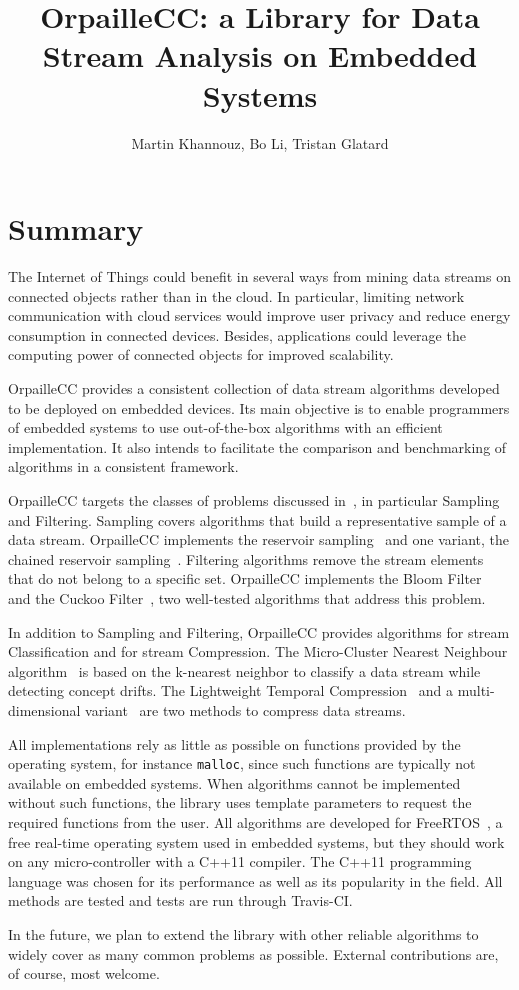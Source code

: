 \documentclass{article}
\title{OrpailleCC: a Library for Data Stream Analysis on Embedded Systems}
\author{Martin Khannouz, Bo Li, Tristan Glatard}
\begin{document}
\maketitle
\section*{Summary}

The Internet of Things could benefit in several ways from mining data 
streams on connected objects rather than in the cloud. In particular, 
limiting network communication with cloud services would improve user 
privacy and reduce energy consumption in connected devices. Besides, 
applications could leverage the computing power of connected objects 
for improved scalability.

OrpailleCC provides a consistent collection of data stream algorithms 
developed to be deployed on embedded devices. Its main objective
is to enable programmers of embedded systems to use 
out-of-the-box algorithms with an efficient implementation. It also 
intends to facilitate the comparison and benchmarking of algorithms in a 
consistent framework.

OrpailleCC targets the classes of problems discussed in~\cite{kejariwal2015},
 in particular Sampling and 
Filtering. Sampling covers algorithms that 
build a representative sample of a
data stream. OrpailleCC implements the reservoir
sampling~\cite{reservoir_sampling} and one variant, the chained reservoir
sampling~\cite{chained_reservoir_sampling}. Filtering algorithms
remove the stream elements that do not belong to a specific set.
OrpailleCC implements the Bloom Filter~\cite{bloom} and the Cuckoo
Filter~\cite{cuckoo_filter}, two well-tested algorithms that address this
problem.

In addition to Sampling and Filtering, OrpailleCC
provides algorithms for stream Classification and for stream Compression. The 
Micro-Cluster Nearest Neighbour algorithm~\cite{mc-nn} is based on the 
k-nearest neighbor to classify a data stream while detecting concept 
drifts. The Lightweight Temporal Compression~\cite{ltc} and a 
multi-dimensional variant~\cite{ltcd} are two methods to compress data 
streams.

All implementations rely as little as possible on functions provided by the 
operating system, for instance \texttt{malloc}, since such functions are typically
not available on embedded systems. When algorithms cannot be
implemented without such functions, the library uses template parameters to 
request the required functions from the user.  All algorithms are 
developed for FreeRTOS~\cite{freertos}, a free real-time operating 
system used in embedded systems, but they should work on any 
micro-controller with a C++11 compiler. The C++11 programming language 
was chosen for its performance as well as its popularity in the 
field. All methods are tested and tests are run through Travis-CI.

In the future, we plan to extend the library with other reliable 
algorithms to widely cover as many common problems as possible.
External contributions are, of course, most welcome.




\end{document}
